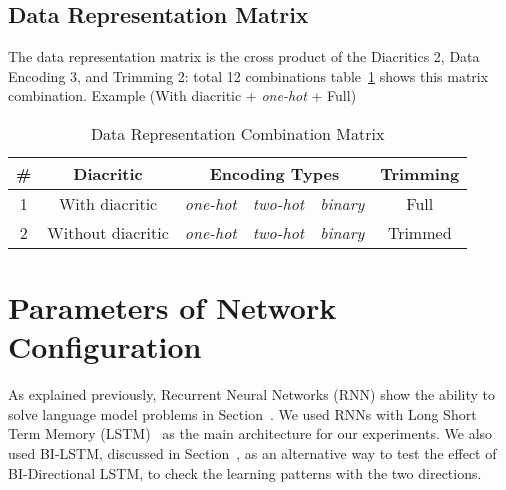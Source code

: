 \subsection{Data Representation Matrix}

The data representation matrix is the cross product of the Diacritics 2, Data Encoding 3, and Trimming 2: total 12 combinations table~\ref{Tab:Data_Representation_Matrix} shows this matrix combination. Example (With diacritic + \textit{one-hot} + Full)


\begin{table}[t]
 \centering
 \begin{tabular}{c c c c c c}
 \hline
 \textbf{\#} & \textbf{Diacritic} & \multicolumn{3}{c}{\textbf{Encoding Types}} & \textbf{Trimming} \\
 
 \hline
 1 & With diacritic & \textit{one-hot} & \textit{two-hot} & \textit{binary} & Full \\
 \hline
 2 & Without diacritic & \textit{one-hot} & \textit{two-hot} & \textit{binary} & Trimmed \\
 \hline
 \end{tabular}
 \caption{Data Representation Combination Matrix}\label{Tab:Data_Representation_Matrix}
\end{table}


%  
\section{Parameters of Network Configuration}\label{Sec:Rnn_Param}

As explained previously, Recurrent Neural Networks (RNN) show the ability to solve language model problems in Section~. We used RNNs with Long Short Term Memory (LSTM)~ as the main architecture for our experiments. We also used BI-LSTM, discussed in Section~, as an alternative way to test the effect of BI-Directional LSTM, to check the learning patterns with the two directions.

